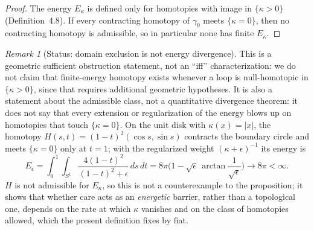 \documentclass[11pt]{article}
\theoremstyle{plain}
\theoremstyle{definition}
\theoremstyle{remark}
\newtheorem{remark}[theorem]{Remark}
\begin{document}
\begin{proof}
The energy \(E_\kappa\) is defined only for homotopies with image in \(\{\kappa>0\}\) (Definition~4.8). If every contracting homotopy of \(\gamma_0\) meets \(\{\kappa=0\}\), then no contracting homotopy is admissible, so in particular none has finite \(E_\kappa\).
\end{proof}

\begin{remark}[Status: domain exclusion is not energy divergence]\label{rem:careEnergyLimit}
This is a geometric sufficient obstruction statement, not an ``iff'' characterization: we do not claim that finite-energy homotopy exists whenever a loop is null-homotopic in \(\{\kappa>0\}\), since that requires additional geometric hypotheses. It is also a statement about the admissible class, not a quantitative divergence theorem: it does not say that every extension or regularization of the energy blows up on homotopies that touch \(\{\kappa=0\}\). On the unit disk with \(\kappa(x)=|x|\), the homotopy \(H(s,t)=(1-t)^2(\cos s,\sin s)\) contracts the boundary circle and meets \(\{\kappa=0\}\) only at \(t=1\); with the regularized weight \((\kappa+\epsilon)^{-1}\) its energy is
\[
E_\epsilon=\int_0^1\!\!\int_{S^1}\frac{4(1-t)^2}{(1-t)^2+\epsilon}\,ds\,dt=8\pi\Big(1-\sqrt\epsilon\,\arctan\frac1{\sqrt\epsilon}\Big)\longrightarrow 8\pi<\infty .
\]
\(H\) is not admissible for \(E_\kappa\), so this is not a counterexample to the proposition; it shows that whether care acts as an \emph{energetic} barrier, rather than a topological one, depends on the rate at which \(\kappa\) vanishes and on the class of homotopies allowed, which the present definition fixes by fiat.
\end{remark}
\end{document}
